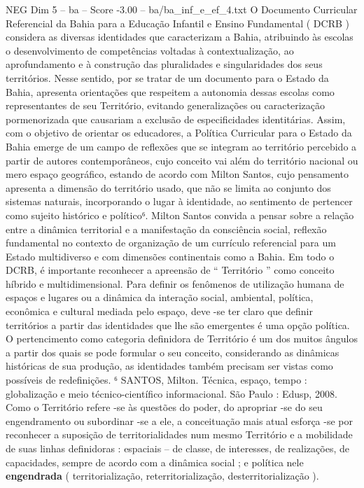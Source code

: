 \begin{textsample}{NEG Dim 5 – ba – Score -3.00 – ba/ba\_inf\_e\_ef\_4.txt}  \label{ex:f5_neg_009}
O Documento Curricular Referencial da Bahia para a Educação Infantil e Ensino Fundamental ( DCRB ) considera as diversas identidades que caracterizam a Bahia, atribuindo às escolas o desenvolvimento de competências voltadas à contextualização, ao aprofundamento e à construção das pluralidades e singularidades dos seus territórios.
Nesse sentido, por se tratar de um documento para o Estado da Bahia, apresenta orientações que respeitem a autonomia dessas escolas como representantes de seu Território, evitando generalizações ou caracterização pormenorizada que causariam a exclusão de especificidades identitárias.
Assim, com o objetivo de orientar os educadores, a Política Curricular para o Estado da Bahia emerge de um campo de reflexões que se integram ao território percebido a partir de autores contemporâneos, cujo conceito vai além do território nacional ou mero espaço geográfico, estando de acordo com Milton Santos, cujo pensamento apresenta a dimensão do território usado, que não se limita ao conjunto dos sistemas naturais, incorporando o lugar à identidade, ao sentimento de pertencer como sujeito histórico e político⁶.
Milton Santos convida a pensar sobre a relação entre a dinâmica territorial e a manifestação da consciência social, reflexão fundamental no contexto de organização de um currículo referencial para um Estado multidiverso e com dimensões continentais como a Bahia.
Em todo o DCRB, é importante reconhecer a apreensão de “ Território ” como conceito híbrido e multidimensional.
Para definir os fenômenos de utilização humana de espaços e lugares ou a dinâmica da interação social, ambiental, política, econômica e cultural mediada pelo espaço, deve -se ter claro que definir territórios a partir das identidades que lhe são emergentes é uma opção política.
O pertencimento como categoria definidora de Território é um dos muitos ângulos a partir dos quais se pode formular o seu conceito, considerando as dinâmicas históricas de sua produção, as identidades também precisam ser vistas como possíveis de redefinições. ⁶ SANTOS, Milton.
Técnica, espaço, tempo : globalização e meio técnico-científico informacional.
São Paulo : Edusp, 2008.
Como o Território refere -se às questões do poder, do apropriar -se do seu engendramento ou subordinar -se a ele, a conceituação mais atual esforça -se por reconhecer a suposição de territorialidades num mesmo Território e a mobilidade de suas linhas definidoras : espaciais – de classe, de interesses, de realizações, de capacidades, sempre de acordo com a dinâmica social ; e política nele \textbf{engendrada} ( territorialização, reterritorialização, desterritorialização ).

\end{textsample}
